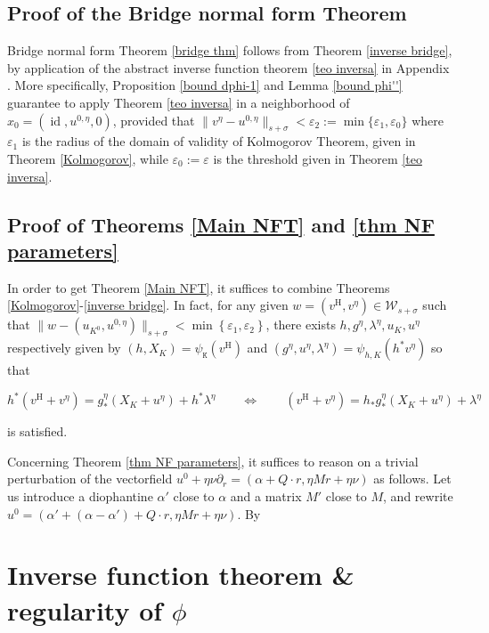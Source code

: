 \documentclass[oneside, 11pt]{amsbook}
\newcommand{\set}[1]{{\left\{#1\right\}}}
\newcommand{\eps}{\varepsilon}
\newcommand{\vh}{v^{\text{H}}} %
\newcommand{\id}{\operatorname{id}}
\newcommand{\cW}{{\mathcal W}}
\newcommand{\tK}{{\mathtt{K}}}
\newcommand{\0}{{(0)}}
\newcommand{\3}{{(3)}}
\numberwithin{equation}{section}
\numberwithin{defn}{section}
\numberwithin{prop}{section}
\numberwithin{cor}{section}
\numberwithin{lemma}{section}
\numberwithin{rmk}{section}
\numberwithin{corollary}{section}
\begin{document}
\subsection{Proof of the Bridge normal form Theorem }

Bridge normal form Theorem \ref{bridge thm} follows from Theorem \ref{inverse bridge}, by application of the abstract inverse function theorem \ref{teo inversa} in Appendix \label{section teorema inversa}. More specifically, Proposition \ref{bound dphi-1} and Lemma \ref{bound phi''} guarantee to apply Theorem \ref{teo inversa} in a neighborhood of $x_0 = (\id, u^{0,\eta},0)$, provided that $\|v^\eta - u^{0,\eta}\|_{s+\sigma} < \eps_2 :=\min\{\eps_1,\eps_0\}$ where $\eps_1$ is the radius of the domain of validity of Kolmogorov Theorem, given in Theorem \ref{Kolmogorov}, while $\eps_0:=\eps$ is the threshold given in Theorem \ref{teo inversa}.
\subsection{Proof of Theorems \ref{Main NFT} and \ref{thm NF parameters}}

In order to get Theorem \ref{Main NFT}, it suffices to combine  Theorems \ref{Kolmogorov}-\ref{inverse bridge}. In fact, for any given $w = (\vh, v^\eta)\in\cW_{s+\sigma}$ such that $\| w - (u_{K^0}, u^{0,\eta})\|_{s+\sigma} < \min\set{\eps_1,\eps_2}$, there exists $h,g^\eta,\lambda^\eta, u_K, u^\eta$ respectively given by $(h,X_K) = \psi_{\tK}(\vh)$ and $(g^\eta,u^\eta,\lambda^\eta) = \psi_{h,K}(h^*v^\eta)$ so that

$$h^*(\vh + v^\eta) = g^\eta_*(X_K + u^\eta) + h^*\lambda^\eta \quad \quad \Leftrightarrow\quad \quad (\vh + v^\eta) = h_*g^\eta_*(X_K + u^\eta) + \lambda^\eta $$ 

is satisfied. 

\smallskip

Concerning Theorem \ref{thm NF parameters}, it suffices to reason on a trivial perturbation of the vectorfield $u^0 + \eta\nu\partial_r = (\alpha + Q\cdot r, \eta M r + \eta\nu)$ as follows. Let us introduce a diophantine $\alpha'$ close to $\alpha$ and a matrix $M'$ close to $M$, and rewrite $u^0 = (\alpha' + (\alpha - \alpha') + Q\cdot r, \eta Mr + \eta\nu)$. By 


\appendix
\section{Inverse function theorem \& regularity of $\phi$ }
\label{section teorema inversa}
\end{document}
